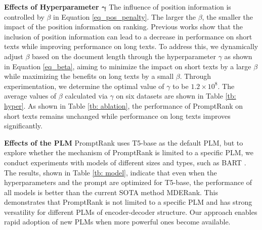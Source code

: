 \documentclass[11pt]{article}
\begin{document}
\begin{table}[ht]
\centering
{}
\caption{Information of hyperparameter setting. $0.2-1$ means the dataset is not sensitive to $\alpha$. $\beta_{\gamma}$ represents the average values of $beta$ calculated by $\gamma$ on various datasets and the last three datasets have the same value because of truncation. }
\label{tb: hyper}
\end{table}



\noindent
{\bf Effects of Hyperparameter $\bm{\gamma}$} The influence of position information is controlled by $\beta$ in Equation \ref{eq_pos_penalty}. The larger the $\beta$, the smaller the impact of the position information on ranking. Previous works \cite{bennani-smires-etal-2018-simple, 8954611} show that the inclusion of position information can lead to a decrease in performance on short texts while improving performance on long texts. To address this, we dynamically adjust $\beta$ based on the document length through the hyperparameter $\gamma$ as shown in Equation \ref{eq_beta}, aiming to minimize the impact on short texts by a large $\beta$ while maximizing the benefits on long texts by a small $\beta$. Through experimentation, we determine the optimal value of $\gamma$ to be $1.2 \times 10^{8}$. The average values of $\beta$ calculated via $\gamma$ on six datasets are shown in Table \ref{tb: hyper}. As shown in Table \ref{tb: ablation}, the performance of PromptRank on short texts remains unchanged while performance on long texts improves significantly.




\noindent
{\bf Effects of the PLM} 
PromptRank uses T5-base as the default PLM, but to explore whether the mechanism of PromptRank is limited to a specific PLM, we conduct experiments with models of different sizes and types, such as BART \cite{lewis-etal-2020-bart}. The results, shown in Table \ref{tb: model}, indicate that even when the hyperparameters and the prompt are optimized for T5-base, the performance of all models is better than the current SOTA method MDERank. This demonstrates that PromptRank is not limited to a specific PLM and has strong versatility for different PLMs of encoder-decoder structure. Our approach enables rapid adoption of new PLMs when more powerful ones become available.
\end{document}
